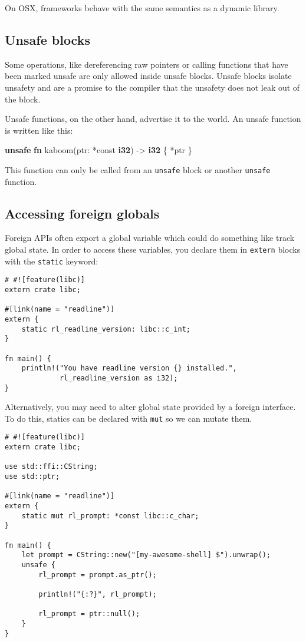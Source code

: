 \documentclass[a4paper,]{book}
\newenvironment{Shaded}{\begin{snugshade}}{\end{snugshade}}
\newcommand{\KeywordTok}[1]{\textcolor[rgb]{0.13,0.29,0.53}{\textbf{{#1}}}}
\newcommand{\NormalTok}[1]{{#1}}
\begin{document}
On OSX, frameworks behave with the same semantics as a dynamic library.

\subsection{Unsafe blocks}\label{unsafe-blocks}

Some operations, like dereferencing raw pointers or calling functions
that have been marked unsafe are only allowed inside unsafe blocks.
Unsafe blocks isolate unsafety and are a promise to the compiler that
the unsafety does not leak out of the block.

Unsafe functions, on the other hand, advertise it to the world. An
unsafe function is written like this:

\begin{Shaded}
\begin{Highlighting}[]
\KeywordTok{unsafe} \KeywordTok{fn} \NormalTok{kaboom(ptr: *const }\KeywordTok{i32}\NormalTok{) -> }\KeywordTok{i32} \NormalTok{\{ *ptr \}}
\end{Highlighting}
\end{Shaded}

This function can only be called from an \texttt{unsafe} block or
another \texttt{unsafe} function.

\subsection{Accessing foreign globals}\label{accessing-foreign-globals}

Foreign APIs often export a global variable which could do something
like track global state. In order to access these variables, you declare
them in \texttt{extern} blocks with the \texttt{static} keyword:

\begin{verbatim}
# #![feature(libc)]
extern crate libc;

#[link(name = "readline")]
extern {
    static rl_readline_version: libc::c_int;
}

fn main() {
    println!("You have readline version {} installed.",
             rl_readline_version as i32);
}
\end{verbatim}

Alternatively, you may need to alter global state provided by a foreign
interface. To do this, statics can be declared with \texttt{mut} so we
can mutate them.

\begin{verbatim}
# #![feature(libc)]
extern crate libc;

use std::ffi::CString;
use std::ptr;

#[link(name = "readline")]
extern {
    static mut rl_prompt: *const libc::c_char;
}

fn main() {
    let prompt = CString::new("[my-awesome-shell] $").unwrap();
    unsafe {
        rl_prompt = prompt.as_ptr();

        println!("{:?}", rl_prompt);

        rl_prompt = ptr::null();
    }
}
\end{verbatim}
\end{document}

